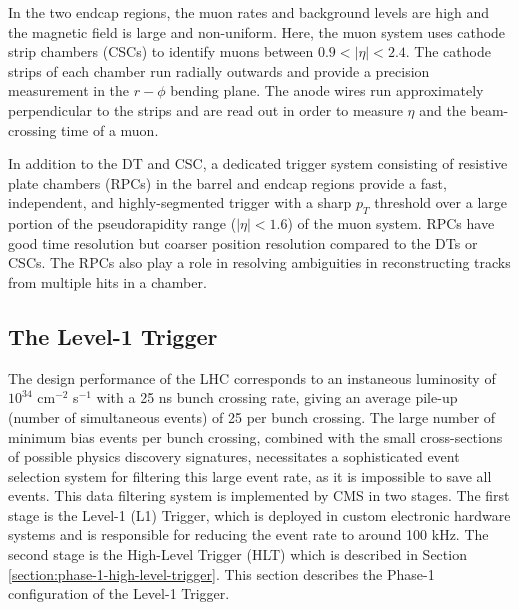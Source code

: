 \documentclass{article}
\begin{document}
In the two endcap regions, the muon rates and background levels are high and the magnetic field is large and non-uniform. Here, the muon system uses cathode strip chambers (CSCs) to identify muons between $0.9 < |\eta| < 2.4$. The cathode strips of each chamber run radially outwards and provide a precision measurement in the $r-\phi$ bending plane. The anode wires run approximately perpendicular to the strips and are read out in order to measure $\eta$ and the beam-crossing time of a muon. 

In addition to the DT and CSC, a dedicated trigger system consisting of resistive plate chambers (RPCs) in the barrel and endcap regions provide a fast, independent, and highly-segmented trigger with a sharp $p_T$ threshold over a large portion of the pseudorapidity range ($|\eta| < 1.6$) of the muon system. RPCs have good time resolution but coarser position resolution compared to the DTs or CSCs. The RPCs also play a role in resolving ambiguities in reconstructing tracks from multiple hits in a chamber. 

\subsection{The Level-1 Trigger}
\label{section:phase-1-l1-trigger}
The design performance of the LHC corresponds to an instaneous luminosity of $10^{34}$ cm$^{-2}$ s$^{-1}$ with a 25 ns bunch crossing rate, giving an average pile-up (number of simultaneous events) of 25 per bunch crossing. The large number of minimum bias events per bunch crossing, combined with the small cross-sections of possible physics discovery signatures, necessitates a sophisticated event selection system for filtering this large event rate, as it is impossible to save all events. This data filtering system is implemented by CMS in two stages. The first stage is the Level-1 (L1) Trigger, which is deployed in custom electronic hardware systems and is responsible for reducing the event rate to around 100 kHz. The second stage is the High-Level Trigger (HLT) which is described in Section \ref{section:phase-1-high-level-trigger}. This section describes the Phase-1 configuration of the Level-1 Trigger.
\end{document}
